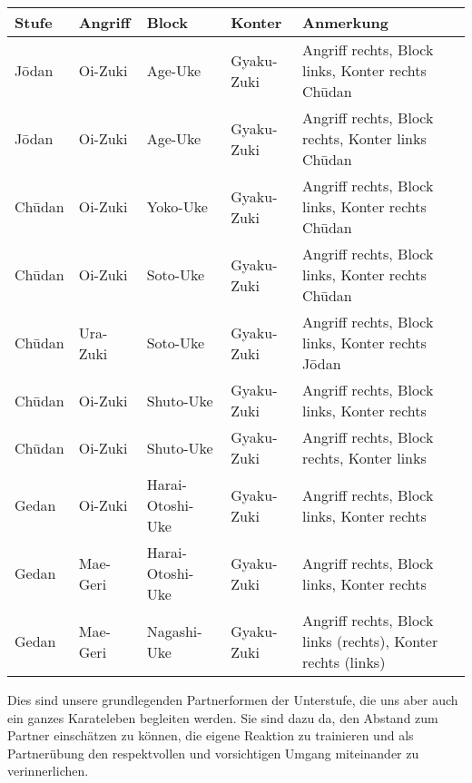 	\null\vfill\null
	{\small 	\begin{tabularx}{\textwidth}{llllX}
			\textbf{Stufe} 	& \textbf{Angriff} 	& \textbf{Block}&\textbf{Konter}&Anmerkung\\
			\midrule
			J\={o}dan 	& Oi-Zuki 	& Age-Uke			&Gyaku-Zuki	& Angriff rechts, Block links, Konter rechts Ch\={u}dan \\
			J\={o}dan 	& Oi-Zuki 	& Age-Uke			&Gyaku-Zuki	& Angriff rechts, Block rechts, Konter links Ch\={u}dan \\	
			Ch\={u}dan	& Oi-Zuki	& Yoko-Uke			&Gyaku-Zuki	& Angriff rechts, Block links, Konter rechts Ch\={u}dan \\
			Ch\={u}dan	& Oi-Zuki	& Soto-Uke			&Gyaku-Zuki	& Angriff rechts, Block links, Konter rechts Ch\={u}dan \\
			Ch\={u}dan	& Ura-Zuki	& Soto-Uke			&Gyaku-Zuki	& Angriff rechts, Block links, Konter rechts J\={o}dan \\
			Ch\={u}dan	& Oi-Zuki	& Shuto-Uke			&Gyaku-Zuki	& Angriff rechts, Block links, Konter rechts \\
			Ch\={u}dan	& Oi-Zuki	& Shuto-Uke			&Gyaku-Zuki	& Angriff rechts, Block rechts, Konter links \\
			Gedan		& Oi-Zuki	& Harai-Otoshi-Uke	&Gyaku-Zuki	& Angriff rechts, Block links, Konter rechts  \\
			Gedan		& Mae-Geri	& Harai-Otoshi-Uke	&Gyaku-Zuki	& Angriff rechts, Block links, Konter rechts \\
			Gedan		& Mae-Geri	& Nagashi-Uke		&Gyaku-Zuki	& Angriff rechts, Block links (rechts), Konter rechts (links)\\
			\midrule
	\end{tabularx}}\null\vfill\null
	\begin{center}
		\parbox{\textwidth-2\tabcolsep}{ Dies sind unsere grundlegenden Partnerformen der Unterstufe, die uns aber auch ein ganzes Karateleben begleiten werden. Sie sind dazu da, den Abstand zum Partner einschätzen zu können, die eigene Reaktion zu trainieren und als Partnerübung den respektvollen und vorsichtigen Umgang miteinander zu verinnerlichen.\onehalfspacing\singlespacing}
		
	\end{center}\null\vfill\null